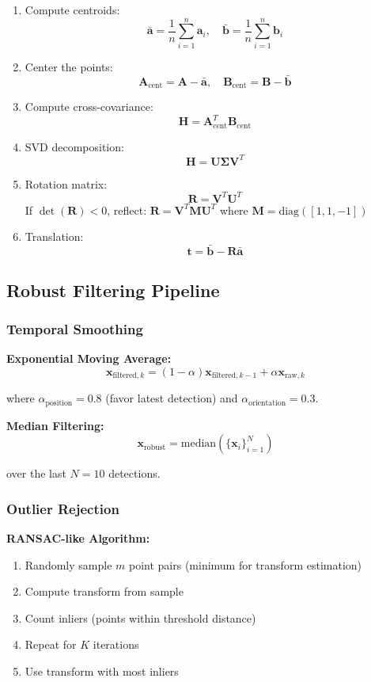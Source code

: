 \documentclass[11pt]{article}
\begin{document}
\begin{enumerate}
    \item Compute centroids:
    \[
    \bar{\mathbf{a}} = \frac{1}{n}\sum_{i=1}^n \mathbf{a}_i, \quad \bar{\mathbf{b}} = \frac{1}{n}\sum_{i=1}^n \mathbf{b}_i
    \]
    \item Center the points:
    \[
    \mathbf{A}_{\text{cent}} = \mathbf{A} - \bar{\mathbf{a}}, \quad \mathbf{B}_{\text{cent}} = \mathbf{B} - \bar{\mathbf{b}}
    \]
    \item Compute cross-covariance:
    \[
    \mathbf{H} = \mathbf{A}_{\text{cent}}^T \mathbf{B}_{\text{cent}}
    \]
    \item SVD decomposition:
    \[
    \mathbf{H} = \mathbf{U} \mathbf{\Sigma} \mathbf{V}^T
    \]
    \item Rotation matrix:
    \[
    \mathbf{R} = \mathbf{V}^T \mathbf{U}^T
    \]
    If $\det(\mathbf{R}) < 0$, reflect: $\mathbf{R} = \mathbf{V}^T \mathbf{M} \mathbf{U}^T$ where $\mathbf{M} = \text{diag}([1, 1, -1])$
    \item Translation:
    \[
    \mathbf{t} = \bar{\mathbf{b}} - \mathbf{R} \bar{\mathbf{a}}
    \]
\end{enumerate}

\subsection{Robust Filtering Pipeline}

\subsubsection{Temporal Smoothing}

\textbf{Exponential Moving Average:}
\[
\mathbf{x}_{\text{filtered},k} = (1-\alpha) \mathbf{x}_{\text{filtered},k-1} + \alpha \mathbf{x}_{\text{raw},k}
\]

where $\alpha_{\text{position}} = 0.8$ (favor latest detection) and $\alpha_{\text{orientation}} = 0.3$.

\textbf{Median Filtering:}
\[
\mathbf{x}_{\text{robust}} = \text{median}(\{\mathbf{x}_i\}_{i=1}^{N})
\]

over the last $N=10$ detections.

\subsubsection{Outlier Rejection}

\textbf{RANSAC-like Algorithm:}
\begin{enumerate}
    \item Randomly sample $m$ point pairs (minimum for transform estimation)
    \item Compute transform from sample
    \item Count inliers (points within threshold distance)
    \item Repeat for $K$ iterations
    \item Use transform with most inliers
\end{enumerate}
\end{document}
